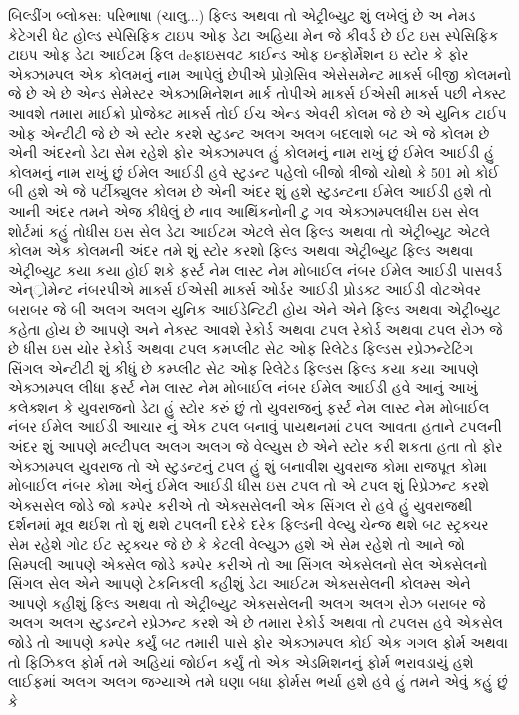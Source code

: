 \documentclass[aspectratio=169, 10pt]{beamer}
\begin{document}
\begin{frame}{બિલ્ડીંગ બ્લોક્સ: પરિભાષા (ચાલુ...)}
{ફિલ્ડ અથવા તો એટ્રીબ્યુટ શું લખેલું છે અ નેમડ કેટેગરી ધેટ હોલ્ડ સ્પેસિફિક ટાઇપ ઓફ ડેટા અહિયા મેન જે કીવર્ડ છે ઈટ ઇસ સ્પેસિફિક ટાઇપ ઓફ ડેટા આઈટમ ફિલ deફાઇસવટ કાઈન્ડ ઓફ ઇન્ફોર્મેશન ઇ સ્ટોર કે ફોર એક્ઝામ્પલ એક કોલમનું નામ આપેલું છેપીએ પ્રોગ્રેસિવ એસેસમેન્ટ માર્ક્સ બીજી કોલમનો જે છે એ છે એન્ડ સેમેસ્ટર એક્ઝામિનેશન માર્ક તોપીએ માર્ક્સ ઈએસી માર્ક્સ પછી નેક્સ્ટ આવશે તમારા માઈક્રો પ્રોજેક્ટ માર્ક્સ તોઈ ઈચ એન્ડ એવરી કોલમ જે છે એ યુનિક ટાઈપ ઓફ એન્ટીટી જે છે એ સ્ટોર કરશે સ્ટુડન્ટ અલગ અલગ બદલાશે બટ એ જે કોલમ છે એની અંદરનો ડેટા સેમ રહેશે ફોર એક્ઝામ્પલ હું કોલમનું નામ રાખું છું ઈમેલ આઈડી હું કોલમનું નામ રાખું છું ઈમેલ આઈડી હવે સ્ટુડન્ટ પહેલો બીજો ત્રીજો ચોથો કે 501 મો કોઈ બી હશે એ જે પર્ટીક્યુલર કોલમ છે એની અંદર શું હશે સ્ટુડન્ટના ઈમેલ આઈડી હશે તો આની અંદર તમને એજ કીધેલું છે નાવ આથિંકનોની ટુ ગવ એક્ઝામ્પલધીસ ઇસ સેલ શોર્ટમાં કહું તોધીસ ઇસ સેલ ડેટા આઈટમ એટલે સેલ ફિલ્ડ અથવા તો એટ્રીબ્યુટ એટલે કોલમ એક કોલમની અંદર તમે શું સ્ટોર કરશો ફિલ્ડ અથવા એટ્રીબ્યુટ ફિલ્ડ અથવા એટ્રીબ્યુટ કયા કયા હોઈ શકે ફર્સ્ટ નેમ લાસ્ટ નેમ મોબાઈલ નંબર ઈમેલ આઈડી પાસવર્ડ એન્્રોમેન્ટ નંબરપીએ માર્ક્સ ઈએસી માર્ક્સ ઓર્ડર આઈડી પ્રોડક્ટ આઈડી વોટએવર બરાબર જે બી અલગ અલગ યુનિક આઈડેન્ટિટી હોય એને એને ફિલ્ડ અથવા એટ્રીબ્યુટ કહેતા હોય છે આપણે અને નેક્સ્ટ આવશે રેકોર્ડ અથવા ટપલ રેકોર્ડ અથવા ટપલ રોઝ જે છે ધીસ ઇસ યોર રેકોર્ડ અથવા ટપલ કમપ્લીટ સેટ ઓફ રિલેટેડ ફિલ્ડસ રપ્રેઝન્ટેટિંગ સિંગલ એન્ટીટી શું કીધું છે કમ્પ્લીટ સેટ ઓફ રિલેટેડ ફિલ્ડસ ફિલ્ડ કયા કયા આપણે એક્ઝામ્પલ લીધા ફર્સ્ટ નેમ લાસ્ટ નેમ મોબાઈલ નંબર ઈમેલ આઈડી હવે આનું આખું કલેક્શન કે યુવરાજનો ડેટા હું સ્ટોર કરું છું તો યુવરાજનું ફર્સ્ટ નેમ લાસ્ટ નેમ મોબાઈલ નંબર ઈમેલ આઈડી આચાર નું એક ટપલ બનાવું પાયથનમાં ટપલ આવતા હતાને ટપલની અંદર શું આપણે મલ્ટીપલ અલગ અલગ જે વેલ્યુસ છે એને સ્ટોર કરી શકતા હતા તો ફોર એક્ઝામ્પલ યુવરાજ તો એ સ્ટુડન્ટનું ટપલ હું શું બનાવીશ યુવરાજ કોમા રાજપૂત કોમા મોબાઈલ નંબર કોમા એનું ઈમેલ આઈડી ધીસ ઇસ ટપલ તો એ ટપલ શું રિપ્રેઝન્ટ કરશે એક્સસેલ જોડે જો કમ્પેર કરીએ તો એક્સસેલની એક સિંગલ રો હવે હું યુવરાજથી દર્શનમાં મૂવ થઈશ તો શું થશે ટપલની દરેકે દરેક ફિલ્ડની વેલ્યુ ચેન્જ થશે બટ સ્ટ્રક્ચર સેમ રહેશે ગોટ ઈટ સ્ટ્રક્ચર જે છે કે કેટલી વેલ્યુઝ હશે એ સેમ રહેશે તો આને જો સિમ્પલી આપણે એક્સેલ જોડે કમ્પેર કરીએ તો આ સિંગલ એક્સેલનો સેલ એક્સેલનો સિંગલ સેલ એને આપણે ટેકનિકલી કહીશું ડેટા આઈટમ એક્સસેલની કોલમ્સ એને આપણે કહીશું ફિલ્ડ અથવા તો એટ્રીબ્યુટ એક્સસેલની અલગ અલગ રોઝ બરાબર જે અલગ અલગ સ્ટુડન્ટને રપ્રેઝન્ટ કરશે એ છે તમારા રેકોર્ડ અથવા તો ટપલસ હવે એકસેલ જોડે તો આપણે કમ્પેર કર્યું બટ તમારી પાસે ફોર એક્ઝામ્પલ કોઈ એક ગગલ ફોર્મ અથવા તો ફિઝિકલ ફોર્મ તમે અહિયાં જોઈન કર્યું તો એક એડમિશનનું ફોર્મ ભરાવડાયું હશે લાઈફમાં અલગ અલગ જગ્યાએ તમે ઘણા બધા ફોર્મસ ભર્યા હશે હવે હું તમને એવું કહું છું કે
}
\end{frame}
\end{document}

